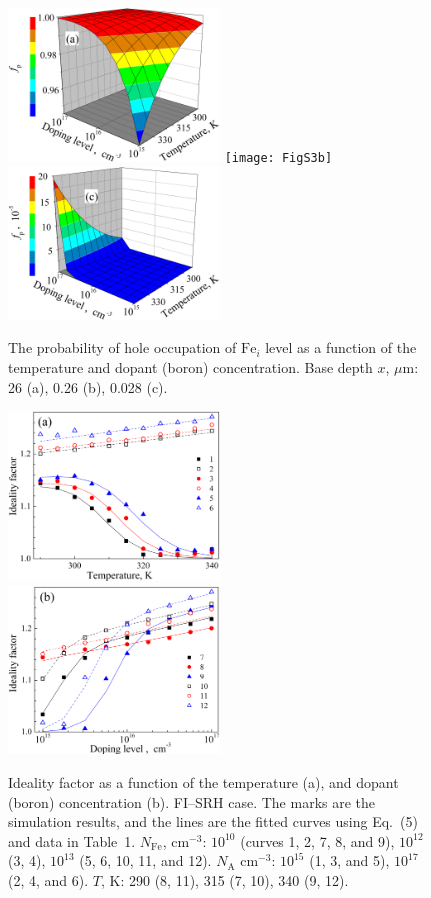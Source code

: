 \documentclass [sort&compress] {elsarticle}
\begin{document}
\begin{figure}
\includegraphics[width=0.5\textwidth]{FigS3a}%
\texttt{[image: FigS3b]}
\includegraphics[width=0.5\textwidth]{FigS3c}
\caption{\label{figS3}
The probability of hole occupation of $\mathrm{Fe}_i$ level as a function of the temperature and dopant (boron) concentration.
Base depth $x$, $\mu$m: 26 (a), 0.26 (b), 0.028 (c).
}%
\end{figure}


\begin{figure}
\includegraphics[width=0.5\textwidth]{FigS4a}%
\includegraphics[width=0.5\textwidth]{FigS4b}
\caption{\label{figS4}
Ideality factor as a function of the temperature (a), and dopant (boron) concentration (b).
FI--SRH case.
The marks are the simulation results, and the lines are the fitted curves using Eq.~(5) and data in Table~1.
$N_\mathrm{Fe}$, cm$^{-3}$: $10^{10}$ (curves 1, 2, 7, 8, and 9), $10^{12}$ (3, 4), $10^{13}$ (5, 6, 10, 11, and 12).
$N_\mathrm{A}$ cm$^{-3}$: $10^{15}$ (1, 3, and 5), $10^{17}$ (2, 4, and 6).
$T$, K: 290 (8, 11), 315 (7, 10), 340 (9, 12).
}%
\end{figure}
\end{document}
